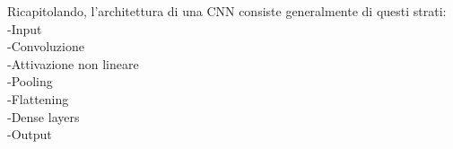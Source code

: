 Ricapitolando, l’architettura di una CNN consiste generalmente di questi strati: \\
-Input\\
-Convoluzione \\
-Attivazione non lineare\\
-Pooling \\
-Flattening\\
-Dense layers\\
-Output\\



